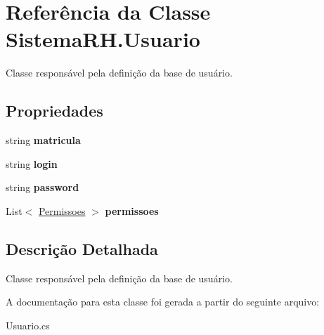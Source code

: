 \hypertarget{class_sistema_r_h_1_1_usuario}{
\section{Referência da Classe SistemaRH.Usuario}
\label{class_sistema_r_h_1_1_usuario}
}


Classe responsável pela definição da base de usuário.  


\subsection*{Propriedades}
\begin{DoxyCompactItemize}
\item 
\hypertarget{class_sistema_r_h_1_1_usuario_a0be7c50b12f004cee33f20384d0550e0}{
string {\bfseries matricula}}
\label{class_sistema_r_h_1_1_usuario_a0be7c50b12f004cee33f20384d0550e0}

\item 
\hypertarget{class_sistema_r_h_1_1_usuario_a00ffae74a7b31d0455d17f9fecd8449c}{
string {\bfseries login}}
\label{class_sistema_r_h_1_1_usuario_a00ffae74a7b31d0455d17f9fecd8449c}

\item 
\hypertarget{class_sistema_r_h_1_1_usuario_afef913e711fc271cac71312d33dc5208}{
string {\bfseries password}}
\label{class_sistema_r_h_1_1_usuario_afef913e711fc271cac71312d33dc5208}

\item 
\hypertarget{class_sistema_r_h_1_1_usuario_ac2d09af0d678ce9dfcbb70d559f1e4c1}{
List$<$ \hyperlink{class_sistema_r_h_1_1_permissoes}{Permissoes} $>$ {\bfseries permissoes}}
\label{class_sistema_r_h_1_1_usuario_ac2d09af0d678ce9dfcbb70d559f1e4c1}

\end{DoxyCompactItemize}


\subsection{Descrição Detalhada}
Classe responsável pela definição da base de usuário. 

A documentação para esta classe foi gerada a partir do seguinte arquivo:\begin{DoxyCompactItemize}
\item 
Usuario.cs\end{DoxyCompactItemize}
